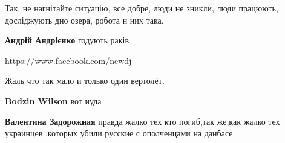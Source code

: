 \begin{itemize}
 

Так, не нагнітайте ситуацію, все добре, люди не зникли, люди працюють, досліджують дно озера, робота н них така.

\begin{itemize}
 
\textbf{Андрій Андрієнко} годують раків
\end{itemize}

\url{https://www.facebook.com/newdj}\par
 
Жаль что так мало и только один вертолёт.

\begin{itemize}
 
\textbf{Bodzin Wilson} вот иуда

\begin{itemize}
 
\textbf{Валентина Задорожная} правда жалко тех кто погиб,так же,как жалко тех украинцев ,которых убили русские с ополченцами на данбасе.

 

\end{itemize}
\end{itemize}
\end{itemize}
